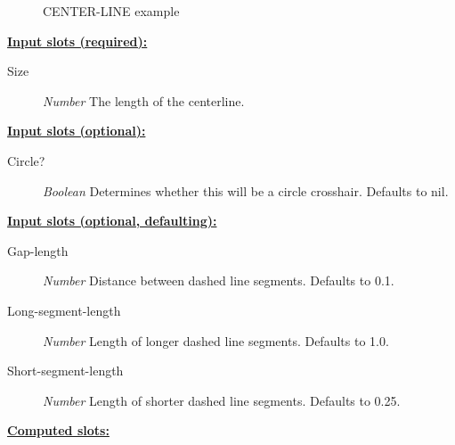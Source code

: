 \documentclass [11pt]{book}
\begin{document}
\begin{itemize}
\begin{figure}
\caption{CENTER-LINE example}

\label{fig:CENTER-LINE}

\end{figure}





\textbf{
\underline{Input slots (required):}}

\begin{description}

\item [Size]
\emph{Number} The length of the centerline.


\end{description}






\textbf{
\underline{Input slots (optional):}}

\begin{description}

\item [Circle?]
\emph{Boolean} Determines whether this will be a circle crosshair. Defaults to nil.


\end{description}






\textbf{
\underline{Input slots (optional, defaulting):}}

\begin{description}

\item [Gap-length]
\emph{Number} Distance between dashed line segments. Defaults to 0.1.


\item [Long-segment-length]
\emph{Number} Length of longer dashed line segments. Defaults to 1.0.


\item [Short-segment-length]
\emph{Number} Length of shorter dashed line segments. Defaults to 0.25.


\end{description}






\textbf{
\underline{Computed slots:}}

\begin{description}


\end{description}
\end{itemize}
\end{document}

